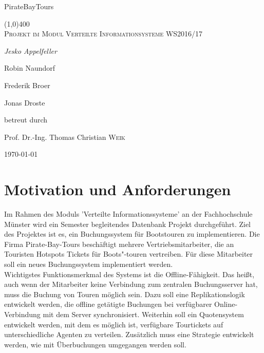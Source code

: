 \documentclass[12pt,a4paper,ngerman,english]{report}
\newenvironment{abstractpage}
{\cleardoublepage\vspace*{\fill}\thispagestyle{empty}}
{\vfill\cleardoublepage}
\newenvironment{abstrac}[1]
{\bigskip\selectlanguage{#1}%
	\begin{center}\bfseries\abstractname\end{center}}
{\par\bigskip}
\begin{document}
\begin{titlepage}
\begin{center}	
	\Huge{PirateBayTours}
	
	\line(1,0){400} \\
	\textsc{\Large Projekt im Modul Verteilte Informationsysteme WS2016/17}\\
	[10cm]

	{\Large\itshape Jesko Appelfeller \par Robin Naundorf \par Frederik Broer \par Jonas Droste \par  }
	\vfill

	\large{betreut durch\par
		Prof. Dr.-Ing. Thomas Christian \textsc{Weik}}

	\vfill
	{\large \today\par}

\end{center}
\end{titlepage}


\newpage
\begin{abstractpage}
	\begin{abstrac}{ngerman}
	\end{abstrac}
	
	\begin{abstrac}{english}
	\end{abstrac}
\end{abstractpage}



\newpage
\tableofcontents

\chapter{Motivation und Anforderungen}
Im Rahmen des Moduls 'Verteilte Informationssysteme' an der Fachhochschule Münster wird ein Semester begleitendes Datenbank Projekt durchgeführt. Ziel des Projektes ist es, ein Buchungssystem für Bootstouren zu implementieren. Die Firma Pirate-Bay-Tours beschäftigt mehrere Vertriebsmitarbeiter, die an Touristen Hotspots Tickets für Boots"-touren vertreiben. Für diese Mitarbeiter soll ein neues Buchungssystem implementiert werden.\\
Wichtigstes Funktionsmerkmal des Systems ist die Offline-Fähigkeit. Das heißt, auch wenn der Mitarbeiter keine Verbindung zum zentralen Buchungsserver hat, muss die Buchung von Touren möglich sein. Dazu soll eine Replikationslogik entwickelt werden, die offline getätigte Buchungen bei verfügbarer Online-Verbindung mit dem Server synchronisiert. Weiterhin soll ein Quotensystem entwickelt werden, mit dem es möglich ist, verfügbare Tourtickets auf unterschiedliche Agenten zu verteilen. Zusätzlich muss eine Strategie entwickelt werden, wie mit Überbuchungen umgegangen werden soll.
\end{document}
